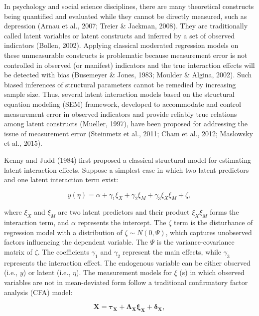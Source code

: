 \documentclass[
  man]{apa7}
\begin{document}
In psychology and social science disciplines, there are many theoretical constructs being quantified and evaluated while they cannot be directly measured, such as depression (Arnau et al., 2007; Treier \& Jackman, 2008). They are traditionally called latent variables or latent constructs and inferred by a set of observed indicators (Bollen, 2002). Applying classical moderated regression models on these unmeasurable constructs is problematic because measurement error is not controlled in observed (or manifest) indicators and the true interaction effects will be detected with bias (Busemeyer \& Jones, 1983; Moulder \& Algina, 2002). Such biased inferences of structural parameters cannot be remedied by increasing sample size. Thus, several latent interaction models based on the structural equation modeling (SEM) framework, developed to accommodate and control measurement error in observed indicators and provide reliably true relations among latent constructs (Mueller, 1997), have been proposed for addressing the issue of measurement error (Steinmetz et al., 2011; Cham et al., 2012; Maslowsky et al., 2015).

Kenny and Judd (1984) first proposed a classical structural model for estimating latent interaction effects. Suppose a simplest case in which two latent predictors and one latent interaction term exist:

\begin{equation}
y (\eta) = \alpha + \gamma_{1}\xi_{X} + \gamma_{2}\xi_{M} + \gamma_{3}\xi_{X}\xi_{M} + \zeta,
\end{equation}

where \(\xi_{X}\) and \(\xi_{M}\) are two latent predictors and their product \(\xi_{X}\xi_{M}\) forms the interaction term, and \(\alpha\) represents the intercept. The \(\zeta\) term is the disturbance of regression model with a distribution of \(\zeta \sim N(0, \Psi)\), which captures unobserved factors influencing the dependent variable. The \(\Psi\) is the variance-covariance matrix of \(\zeta\). The coefficients \(\gamma_{1}\) and \(\gamma_{2}\) represent the main effects, while \(\gamma_{3}\) represents the interaction effect. The endogenous variable can be either observed (i.e., \(y\)) or latent (i.e., \(\eta\)). The measurement models for \(\xi\) (s) in which observed variables are not in mean-deviated form follow a traditional confirmatory factor analysis (CFA) model:

\begin{equation}
\textbf{X} = \boldsymbol{\tau_{X}} + \boldsymbol{\Lambda_{X}\xi_{X}} + \boldsymbol{\delta_{X}},
\end{equation}
\end{document}
